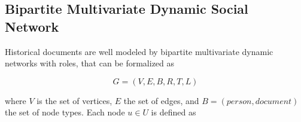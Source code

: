 



\subsection{Bipartite Multivariate Dynamic Social Network}\label{subsec:hsna-bipartite-model}

Historical documents are well modeled by bipartite multivariate dynamic networks with roles, that can be formalized as

\begin{equation}
    G = (V, E, B, R, T, L)
\end{equation}

where $V$ is the set of vertices, $E$ the set of edges, and $B = (person, document)$ the set of node types.
Each node $u \in U$ is defined as

